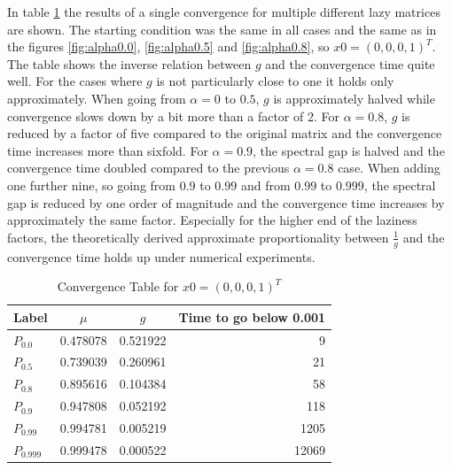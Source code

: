 In table \ref{tab:conv_x4=1} the results of a single convergence for multiple different lazy matrices are shown.
The starting condition was the same in all cases and the same as in the figures \ref{fig:alpha0.0},  \ref{fig:alpha0.5} and \ref{fig:alpha0.8}, so $x0 = (0, 0, 0, 1)^T$.
The table shows the inverse relation between $g$ and the convergence time quite well.
For the cases where $g$ is not particularly close to one it holds only approximately.
When going from $\alpha=0$ to $0.5$, $g$ is approximately halved while convergence slows down by a bit more than a factor of 2.
For $\alpha=0.8$, $g$ is reduced by a factor of five compared to the original matrix and the convergence time increases more than sixfold.
For $\alpha=0.9$, the spectral gap is halved and the convergence time doubled compared to the previous $\alpha=0.8$ case.
When adding one further nine, so going from $0.9$ to $0.99$ and from $0.99$ to $0.999$, the spectral gap is reduced by one order of magnitude and the convergence time increases by approximately the same factor.
Especially for the higher end of the laziness factors, the theoretically derived approximate proportionality between $\frac{1}{g}$ and the convergence time holds up under numerical experiments.

\begin{table}[h]
	\centering
\begin{tabular}{lccr}
	\hline
	Label & $\mu$ &$g$ &  Time to go below \num{0.001}\\
	\hline
	$P_{0.0}$ & 0.478078 &0.521922 &  9 \\
	$P_{0.5}$ & 0.739039 &0.260961 &  21 \\
	$P_{0.8}$ & 0.895616 &0.104384 &  58 \\
	$P_{0.9}$ & 0.947808 &0.052192 &  118 \\
	$P_{0.99}$ & 0.994781 &0.005219 &  1205 \\
	$P_{0.999}$ & 0.999478 &0.000522 &  12069 \\
\end{tabular}
\caption{Convergence Table for $x0 = (0, 0, 0, 1)^T$}
\label{tab:conv_x4=1}
\end{table}

